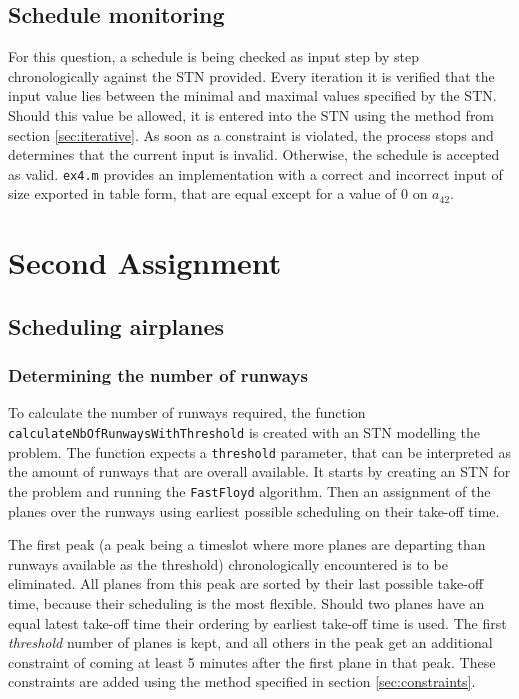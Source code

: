 \documentclass[10pt,a4paper]{article}
\begin{document}
\subsection{Schedule monitoring}
For this question, a schedule is being checked as input step by step chronologically against the STN provided. Every iteration it is verified that the input value lies between the minimal and maximal values specified by the STN. Should this value be allowed, it is entered into the STN using the method from section \ref{sec:iterative}. As soon as a constraint is violated, the process stops and determines that the current input is invalid. Otherwise, the schedule is accepted as valid. \texttt{ex4.m} provides an implementation with a correct and incorrect input of size exported in table form, that are equal except for a value of 0 on $a_{42}$.

\section{Second Assignment}
\subsection{Scheduling airplanes}
\subsubsection{Determining the number of runways}
\label{sec:nb_of_runways}
To calculate the number of runways required, the function  \texttt{calculate\-Nb\-Of\-Run\-ways\-With\-Thres\-hold} is created with an STN modelling the problem. The function expects a \texttt{threshold} parameter, that can be interpreted as the amount of runways that are overall available. It starts by creating an STN for the problem and running the \texttt{FastFloyd} algorithm. Then an assignment of the planes over the runways using earliest possible scheduling on their take-off time.

The first peak (a peak being a timeslot where more planes are departing than runways available as the threshold) chronologically encountered is to be eliminated. All planes from this peak are sorted by their last possible take-off time, because their scheduling is the most flexible. Should two planes have an equal latest take-off time their ordering by earliest take-off time is used. The first \emph{threshold} number of planes is kept, and all others in the peak get an additional constraint of coming at least 5 minutes after the first plane in that peak. These constraints are added using the method specified in section \ref{sec:constraints}.
\end{document}
